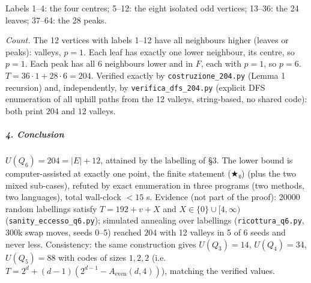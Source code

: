 Labels 1--4: the four centres; 5--12: the eight isolated odd vertices;
13--36: the 24 leaves; 37--64: the 28 peaks.

\emph{Count.} The 12 vertices with labels 1--12 have all neighbours
higher (leaves or peaks): valleys, \(p=1\). Each leaf has exactly one
lower neighbour, its centre, so \(p=1\). Each peak has all 6 neighbours
lower and in \(F\), each with \(p=1\), so \(p=6\).
\(T=36\cdot1+28\cdot6=204\). Verified exactly by
\texttt{costruzione\_204.py} (Lemma 1 recursion) and, independently, by
\texttt{verifica\_dfs\_204.py} (explicit DFS enumeration of all uphill
paths from the 12 valleys, string-based, no shared code): both print
\(204\) and \(12\) valleys.

\subparagraph{4. Conclusion}\label{conclusion}

\(U(Q_6)=204=|E|+12\), attained by the labelling of §3. The lower bound
is computer-assisted at exactly one point, the finite statement (★₀)
(plus the two mixed sub-cases), refuted by exact enumeration in three
programs (two methods, two languages), total wall-clock \(<15\) s.
Evidence (not part of the proof): 20000 random labellings satisfy
\(T=192+v+X\) and \(X\in\{0\}\cup[4,\infty)\)
(\texttt{sanity\_eccesso\_q6.py}); simulated annealing over labellings
(\texttt{ricottura\_q6.py}, 300k swap moves, seeds 0--5) reached \(204\)
with 12 valleys in 5 of 6 seeds and never less. Consistency: the same
construction gives \(U(Q_3)=14\), \(U(Q_4)=34\), \(U(Q_5)=88\) with
codes of sizes \(1,2,2\)
(i.e.~\(T=2^d+(d-1)(2^{d-1}-A_{\text{even}}(d,4))\)), matching the
verified values.


